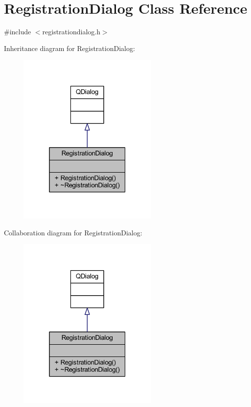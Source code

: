 \hypertarget{class_registration_dialog}{}\section{Registration\+Dialog Class Reference}
\label{class_registration_dialog}


{\ttfamily \#include $<$registrationdialog.\+h$>$}



Inheritance diagram for Registration\+Dialog\+:
\nopagebreak
\begin{figure}[H]
\begin{center}
\leavevmode
\includegraphics[width=196pt]{class_registration_dialog__inherit__graph}
\end{center}
\end{figure}


Collaboration diagram for Registration\+Dialog\+:
\nopagebreak
\begin{figure}[H]
\begin{center}
\leavevmode
\includegraphics[width=196pt]{class_registration_dialog__coll__graph}
\end{center}
\end{figure}
